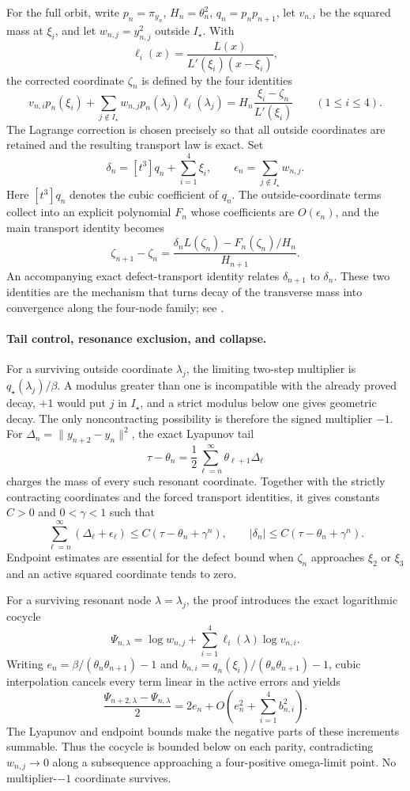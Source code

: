 \documentclass[11pt]{article}
\begin{document}
For the full orbit, write \(p_n=\pi_{y_n}\),
\(H_n=\theta_n^2\), \(q_n=p_np_{n+1}\), let \(v_{n,i}\) be the squared
mass at \(\xi_i\), and let \(w_{n,j}=y_{n,j}^2\) outside \(I_\star\).
With
\[
 \ell_i(x)=\frac{L(x)}{L'(\xi_i)(x-\xi_i)},
\]
the corrected coordinate \(\zeta_n\) is defined by the four identities
\[
 v_{n,i}p_n(\xi_i)
 +\sum_{j\notin I_\star}
   w_{n,j}p_n(\lambda_j)\ell_i(\lambda_j)
 =H_n\frac{\xi_i-\zeta_n}{L'(\xi_i)}
 \qquad(1\leq i\leq4).
\]
The Lagrange correction is chosen precisely so that all outside
coordinates are retained and the resulting transport law is exact.  Set
\[
 \delta_n=[t^3]q_n+\sum_{i=1}^4\xi_i,\qquad
 \epsilon_n=\sum_{j\notin I_\star}w_{n,j}.
\]
Here \([t^3]q_n\) denotes the cubic coefficient of \(q_n\).
The outside-coordinate terms collect into an explicit polynomial \(F_n\)
whose coefficients are \(O(\epsilon_n)\), and the main transport identity
becomes
\[
 \zeta_{n+1}-\zeta_n
 =\frac{\delta_nL(\zeta_n)-F_n(\zeta_n)/H_n}{H_{n+1}}.
\]
An accompanying exact defect-transport identity relates
\(\delta_{n+1}\) to \(\delta_n\).  These two identities are the mechanism
that turns decay of the transverse mass into convergence along the
four-node family; see
.

\paragraph{Tail control, resonance exclusion, and collapse.}
For a surviving outside coordinate \(\lambda_j\), the limiting two-step
multiplier is \(q_\star(\lambda_j)/\beta\).  A modulus greater than one is
incompatible with the already proved decay, \(+\!1\) would put \(j\) in
\(I_\star\), and a strict modulus below one gives geometric decay.  The
only noncontracting possibility is therefore the signed multiplier \(-1\).
For \(\Delta_n=\lVert y_{n+2}-y_n\rVert^2\), the exact Lyapunov tail
\[
 \tau-\theta_n
 =\frac12\sum_{\ell=n}^{\infty}\theta_{\ell+1}\Delta_\ell
\]
charges the mass of every such resonant coordinate.  Together with the
strictly contracting coordinates and the forced transport identities, it
gives constants \(C>0\) and \(0<\gamma<1\) such that
\[
 \sum_{\ell=n}^{\infty}(\Delta_\ell+\epsilon_\ell)
 \leq C(\tau-\theta_n+\gamma^n),\qquad
 \lvert\delta_n\rvert\leq C(\tau-\theta_n+\gamma^n).
\]
Endpoint estimates are essential for the defect bound when \(\zeta_n\)
approaches \(\xi_2\) or \(\xi_3\) and an active squared coordinate tends
to zero.

For a surviving resonant node \(\lambda=\lambda_j\), the proof introduces
the exact logarithmic cocycle
\[
 \Psi_{n,\lambda}
 =\log w_{n,j}+\sum_{i=1}^4\ell_i(\lambda)\log v_{n,i}.
\]
Writing \(e_n=\beta/(\theta_n\theta_{n+1})-1\) and
\(b_{n,i}=q_n(\xi_i)/(\theta_n\theta_{n+1})-1\), cubic interpolation
cancels every term linear in the active errors and yields
\[
 \frac{\Psi_{n+2,\lambda}-\Psi_{n,\lambda}}2
 =2e_n+O\left(e_n^2+\sum_{i=1}^4b_{n,i}^2\right).
\]
The Lyapunov and endpoint bounds make the negative parts of these
increments summable.  Thus the cocycle is bounded below on each parity,
contradicting \(w_{n,j}\to0\) along a subsequence approaching a
four-positive omega-limit point.  No multiplier-\(-1\) coordinate survives.
\end{document}
